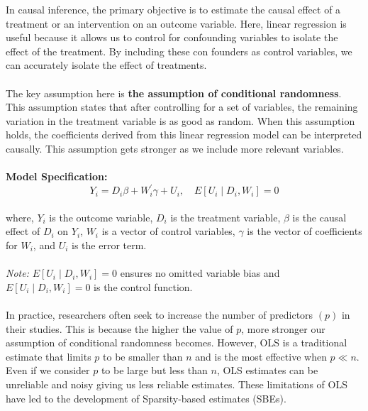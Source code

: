 In causal inference, the primary objective is to estimate the causal effect of a treatment or an intervention on an outcome variable. Here, linear regression is useful because it allows us to control for confounding variables to isolate the effect of the treatment. By including these con founders as control variables, we can accurately isolate the effect of treatments. \\
\\
The key assumption here is \textbf{the assumption of conditional randomness}. This assumption states that after controlling for a set of variables, the remaining variation in the treatment variable is as good as random. When this assumption holds, the coefficients derived from this linear regression model can be interpreted causally. This assumption gets stronger as we include more relevant variables. 
\\
\\
\textbf{Model Specification:}
\\
\begin{equation}
    Y_i=D_i \beta+W_i^{\prime} \gamma+U_i, \quad E\left[U_i \mid D_i, W_i\right]=0
\end{equation}
\\
\noindent where,
$Y_i$ is the outcome variable, $D_i$ is the treatment variable,
$\beta$ is the causal effect of $D_i$ on $Y_i$, 
$W_i$ is a vector of control variables,
$\gamma$ is the vector of coefficients for $W_i$, and $U_i$ is the error term. \\
\\
\textit{Note:}
$E\left[U_i \mid D_i, W_i\right] = 0$ ensures no omitted variable bias and $E\left[U_i \mid D_i, W_i\right]=0$ is the control function.
\\
\\
In practice, researchers often seek to increase the number of predictors $(p)$ in their studies. This is because the higher the value of $p$, more stronger our assumption of conditional randomness becomes. However, OLS is a traditional estimate that limits $p$ to be smaller than $n$ and is the most effective when $p \ll n$. Even if we consider $p$ to be large but less than $n$, OLS estimates can be unreliable and noisy giving us less reliable estimates. These limitations of OLS have led to the development of Sparsity-based estimates (SBEs).

